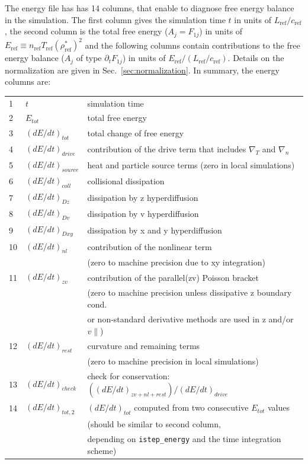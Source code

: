 \documentclass[12pt]{article}
\begin{document}
The energy file has has 14 columns, that enable to diagnose free energy
balance in the simulation.
The first column gives the simulation time $t$ in units of
$L_\mathrm{ref}/c_\mathrm{ref}$, the second column is the total free
energy ($A_j=F_{1j}$) in units of $E_{\mathrm{ref}}\equiv n_{\mathrm{ref}} T_{\mathrm{ref}}
(\rho^*_{\mathrm{ref}})^2$ and the following columns contain contributions to the free
energy balance ($A_j$ of type $\partial_t F_{1j}$) in units of $E_{\mathrm{ref}}/(L_\mathrm{ref}/c_\mathrm{ref})$.
Details on the normalization are given in
Sec.~\ref{sec:normalization}. In summary, the energy columns are:\\[-5ex]
\begin{center}
\begin{tabular}{lll}
1  & $t$ & simulation time\\
2  & $E_{tot}$ & total free energy\\
3  & $(dE/dt)_{tot}$ & total change of free energy\\
4  & $(dE/dt)_{drive}$ & contribution of the drive term that includes $\nabla_T$ and $\nabla_n$\\
5  & $(dE/dt)_{source}$ &heat and particle source terms (zero in local simulations)\\
6  & $(dE/dt)_{coll}$ &collisional dissipation\\
7  & $(dE/dt)_{Dz}$  & dissipation by z hyperdiffusion\\
8  & $(dE/dt)_{Dv}$  & dissipation by v hyperdiffusion\\
9  & $(dE/dt)_{Dxy}$ & dissipation by x and y hyperdiffusion\\
10 & $(dE/dt)_{nl}$  & contribution of the nonlinear term\\
   &                 & (zero to machine precision due to xy integration)\\
11 & $(dE/dt)_{zv}$  & contribution of the parallel(zv) Poisson bracket\\
   &                 & (zero to machine precision unless dissipative z boundary cond.\\
   &                 & or non-standard derivative methods are used in z and/or $v\|$)\\
12 & $(dE/dt)_{rest}$ & curvature and remaining terms \\
   &                 &(zero to machine precision in local simulations)\\
13 & $(dE/dt)_{check}$ & check for conservation:
$((dE/dt)_{zv+nl+rest})/(dE/dt)_{drive}$\\
14 &$(dE/dt)_{tot,2}$ & $(dE/dt)_{tot}$ computed from two consecutive $E_{tot}$ values\\
   &                 &(should be similar to second column,\\
   &                 &depending on \texttt{istep\_energy} and the time integration scheme)\\
\end{tabular}
\end{center}
\end{document}
